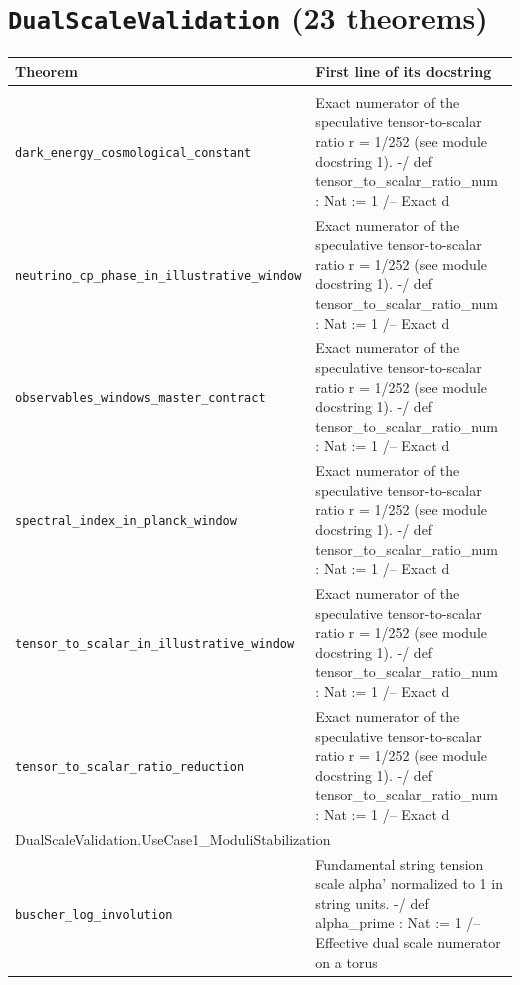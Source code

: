 \section*{\texttt{DualScaleValidation} (23 theorems)}
\begin{longtable}{p{}p{}}\toprule Theorem & First line of its docstring \\ \midrule\endhead\bottomrule\endfoot
\multicolumn{2}{l}{\textsf{\small DualScaleValidation.Observables}} \\
\quad\texttt{\footnotesize dark\_energy\_cosmological\_constant} & {\footnotesize Exact numerator of the speculative tensor-to-scalar ratio r = 1/252 (see module docstring 1). -/ def tensor\_to\_scalar\_ratio\_num : Nat := 1 /-- Exact d} \\
\quad\texttt{\footnotesize neutrino\_cp\_phase\_in\_illustrative\_window} & {\footnotesize Exact numerator of the speculative tensor-to-scalar ratio r = 1/252 (see module docstring 1). -/ def tensor\_to\_scalar\_ratio\_num : Nat := 1 /-- Exact d} \\
\quad\texttt{\footnotesize observables\_windows\_master\_contract} & {\footnotesize Exact numerator of the speculative tensor-to-scalar ratio r = 1/252 (see module docstring 1). -/ def tensor\_to\_scalar\_ratio\_num : Nat := 1 /-- Exact d} \\
\quad\texttt{\footnotesize spectral\_index\_in\_planck\_window} & {\footnotesize Exact numerator of the speculative tensor-to-scalar ratio r = 1/252 (see module docstring 1). -/ def tensor\_to\_scalar\_ratio\_num : Nat := 1 /-- Exact d} \\
\quad\texttt{\footnotesize tensor\_to\_scalar\_in\_illustrative\_window} & {\footnotesize Exact numerator of the speculative tensor-to-scalar ratio r = 1/252 (see module docstring 1). -/ def tensor\_to\_scalar\_ratio\_num : Nat := 1 /-- Exact d} \\
\quad\texttt{\footnotesize tensor\_to\_scalar\_ratio\_reduction} & {\footnotesize Exact numerator of the speculative tensor-to-scalar ratio r = 1/252 (see module docstring 1). -/ def tensor\_to\_scalar\_ratio\_num : Nat := 1 /-- Exact d} \\
\multicolumn{2}{l}{\textsf{\small DualScaleValidation.UseCase1\_ModuliStabilization}} \\
\quad\texttt{\footnotesize buscher\_log\_involution} & {\footnotesize Fundamental string tension scale  alpha' normalized to 1 in string units. -/ def alpha\_prime : Nat := 1 /-- Effective dual scale numerator on a torus } \\

\end{longtable}
